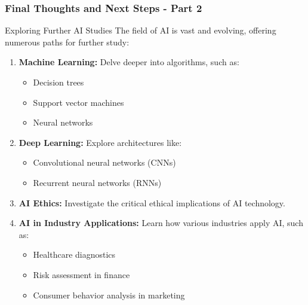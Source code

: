 \documentclass[aspectratio=169]{beamer}
\begin{document}
\begin{frame}[fragile]
    \frametitle{Final Thoughts and Next Steps - Part 2}
    \begin{block}{Exploring Further AI Studies}
        The field of AI is vast and evolving, offering numerous paths for further study:
    \end{block}
    \begin{enumerate}
        \item \textbf{Machine Learning:}
            Delve deeper into algorithms, such as:
            \begin{itemize}
                \item Decision trees
                \item Support vector machines
                \item Neural networks
            \end{itemize}
        \item \textbf{Deep Learning:}
            Explore architectures like:
            \begin{itemize}
                \item Convolutional neural networks (CNNs)
                \item Recurrent neural networks (RNNs)
            \end{itemize}

        \item \textbf{AI Ethics:}
            Investigate the critical ethical implications of AI technology.

        \item \textbf{AI in Industry Applications:}
            Learn how various industries apply AI, such as:
            \begin{itemize}
                \item Healthcare diagnostics
                \item Risk assessment in finance
                \item Consumer behavior analysis in marketing
            \end{itemize}
    \end{enumerate}
\end{frame}
\end{document}
